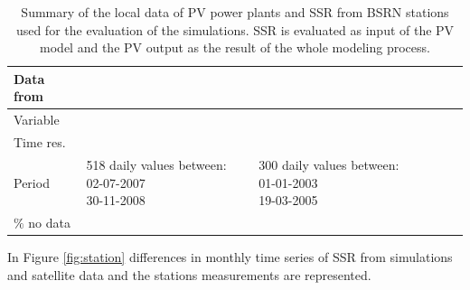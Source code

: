 \begin{table}[h!]
  \begin{tabular}{>{\raggedright}m{2cm}>{\raggedright}m{2cm}>{\raggedright}m{2cm}>{\raggedright}m{2cm}>{\raggedright}m{2cm}>{\raggedright}m{2cm}}
    \toprule 
    Data from & \centering{Seville} & \centering{Tarragona} & \centering{Payerne} &\centering{Sede Boker} &\centering{Carpentras}\tabularnewline
    \midrule
    Variable & \centering{PV productivity} & \centering{PV productivity} & \centering{SSR} & \centering{SSR} & \centering{SSR} 
\tabularnewline
    \midrule
    Time res. & \centering{day} & \centering{day} & \centering{month} & \centering{month} & \centering{month}
                    \tabularnewline
   \midrule
                                                                                            Period & \centering{518 {\small{daily values between:}} 02-07-2007\\30-11-2008} & \centering{300 {\small{daily values between:}} 01-01-2003\\19-03-2005} & \centering{2003-2009} & \centering{2003-2009} & \centering{2003-2009}
                  \tabularnewline    
 \midrule
    $\%$ no data & \centering{0} & \centering{8 $\%$} & \centering{0} & \centering{10.71 $\%$} & \centering{0}
                    \tabularnewline

 \bottomrule
  \end{tabular}
  \caption[Summary of the local PV data from power plants and SSR from BSRN stations]{Summary of the local data of PV power plants and SSR from BSRN stations used for the evaluation of the simulations. SSR is evaluated as input of the PV model and the PV output as the result of the whole modeling process.}
  \label{localData}
\end{table}

In Figure \ref{fig:station} differences in monthly time series of SSR from simulations and satellite data and the stations measurements are represented.


